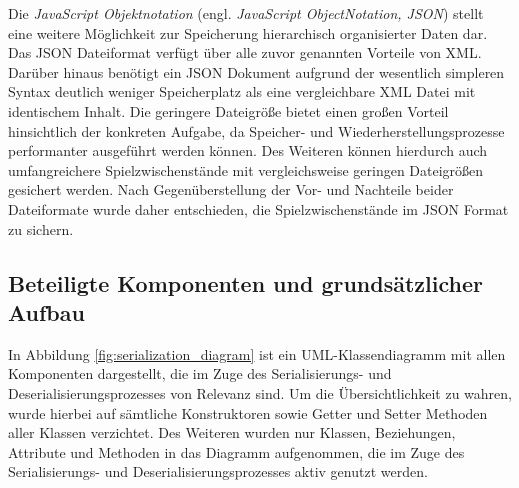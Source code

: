 Die \textit{JavaScript Objektnotation} (engl. \textit{JavaScript ObjectNotation, JSON}) stellt eine weitere Möglichkeit zur Speicherung hierarchisch organisierter Daten dar. Das JSON Dateiformat verfügt über alle zuvor genannten Vorteile von XML. Darüber hinaus benötigt ein JSON Dokument aufgrund der wesentlich simpleren Syntax deutlich weniger Speicherplatz als eine vergleichbare XML Datei mit identischem Inhalt. Die geringere Dateigröße bietet einen großen Vorteil hinsichtlich der konkreten Aufgabe, da Speicher- und Wiederherstellungsprozesse performanter ausgeführt werden können. Des Weiteren können hierdurch auch umfangreichere Spielzwischenstände mit vergleichsweise geringen Dateigrößen gesichert werden. Nach Gegenüberstellung der Vor- und Nachteile beider Dateiformate wurde daher entschieden, die Spielzwischenstände im JSON Format zu sichern. 





\subsection{Beteiligte Komponenten und grundsätzlicher Aufbau}\label{sec:structureSerialization}

In Abbildung \ref{fig:serialization_diagram} ist ein UML-Klassendiagramm mit allen Komponenten dargestellt, die im Zuge des Serialisierungs- und Deserialisierungsprozesses von Relevanz sind. Um die Übersichtlichkeit zu wahren, wurde hierbei auf sämtliche Konstruktoren sowie Getter und Setter Methoden aller Klassen verzichtet. Des Weiteren wurden nur Klassen, Beziehungen, Attribute und Methoden in das Diagramm aufgenommen, die im Zuge des Serialisierungs- und Deserialisierungsprozesses aktiv genutzt werden. 

